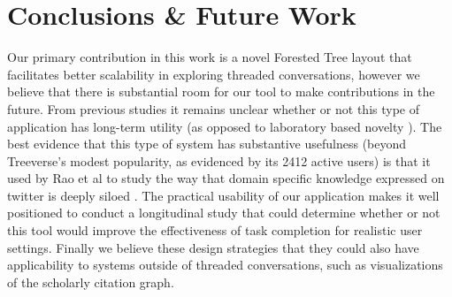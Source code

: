 \documentclass{egpubl}
\begin{document}
\section{Conclusions \& Future Work}
%
Our primary contribution in this work is a novel Forested Tree layout that facilitates better scalability in exploring threaded conversations, however we believe that there is substantial room for our tool to make contributions in the future.
%
%
From previous studies it remains unclear whether or not this type of application has long-term utility (as opposed to laboratory based novelty \cite{isenberg2013systematic}).
%
The best evidence that this type of system has substantive usefulness (beyond Treeverse's modest popularity, as evidenced by its 2412 active users) is that it used by Rao et al to study the way that domain specific knowledge expressed on twitter is deeply siloed \cite{twittercanoes}.
%
The practical usability of our application makes it well positioned to conduct a longitudinal study that could determine whether or not this tool would improve the effectiveness of task completion for realistic user settings.
%
Finally we believe these design strategies that they could also have applicability to systems outside of threaded conversations, such as visualizations of the scholarly citation graph.




\end{document}
